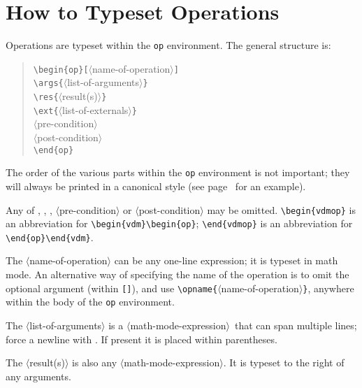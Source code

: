 \documentclass{article}
\renewcommand{\^}[1]{$\langle${\rm #1\/}$\rangle$}
\newcommand{\mmexp}{\^{math-mode-expression}}
\newcommand{\cs}[1]{\leavevmode\hbox{\tt \string#1}}
\begin{document}
\section{How to Typeset Operations}

Operations are typeset within the {\tt op\/} environment.
The general structure is:

\begin{verse}
\verb;\begin{op}[;\^{name-of-operation}\verb;]; \\
\verb;\args{;\^{list-of-arguments}\verb;}; \\
\verb;\res{;\^{result(s)}\verb;}; \\
\verb;\ext{;\^{list-of-externals}\verb;}; \\
\^{pre-condition} \\
\^{post-condition} \\
\verb;\end{op};
\end{verse}

The order of the various parts within the {\tt op} environment is not
important; they will always be printed in a canonical style (see
page~\pageref{op-ex} for an example).

Any of \cs\args, \cs\res, \cs\ext, \^{pre-condition} or
\^{post-condition} may be omitted.  \verb;\begin{vdmop}; is an
abbreviation for \verb;\begin{vdm}\begin{op};;  \verb;\end{vdmop}; is an
abbreviation for \verb;\end{op}\end{vdm};.

The \^{name-of-operation} can be any one-line expression; it is
typeset in math mode.  An alternative way of specifying the name of
the operation is to omit the optional argument (within \verb;[];), and
use \verb;\opname{;\^{name-of-operation}\verb;};, anywhere within the
body of the {\tt op} environment.

The \^{list-of-arguments} is a \mmexp\ that can span multiple lines;
force a newline with \cs\\.  If present it is placed within
parentheses.

The \^{result(s)} is also any \mmexp.  It is typeset to the right of
any arguments.
\end{document}
